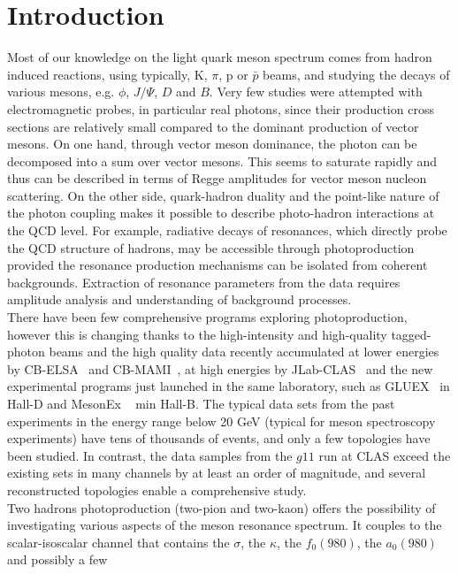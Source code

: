 \documentclass[twocolumn,superscriptaddress,prd]{revtex4}
\begin{document}
\section{\label{sec:intro}Introduction}
Most of our knowledge on the light quark meson spectrum comes from
hadron induced reactions, using typically, K, $\pi$, p or $\bar p$ beams, and studying  the  decays of various mesons,
e.g. $\phi$, $J/\Psi$, $D$ and $B$.
Very few studies were attempted with electromagnetic probes, in particular real photons,  since their production 
cross sections are relatively small compared to the dominant production 
of vector mesons. On one hand, through vector meson dominance,
the photon can be decomposed into a sum over vector
mesons. This seems to saturate rapidly and thus can be described in
terms of Regge amplitudes for vector meson nucleon scattering. On the
other side, quark-hadron duality and the point-like nature of the photon
coupling makes it possible to describe photo-hadron interactions at the
QCD level. For example, radiative decays of resonances, which directly
probe the QCD structure of hadrons, may be accessible through photoproduction
provided the resonance production mechanisms can be isolated
from coherent backgrounds. Extraction of resonance parameters from the
data requires amplitude analysis and understanding of background processes.\\
There have been few comprehensive programs exploring photoproduction,
however this is changing thanks to the high-intensity and high-quality tagged-photon beams and the high quality
data recently accumulated at lower
energies by CB-ELSA~\cite{elsa} and CB-MAMI~\cite{mami}, 
at high energies by JLab-CLAS~\cite{clas}  and the new experimental programs just launched in the same laboratory,
such as GLUEX~\cite{gluex} in Hall-D and MesonEx  ~\cite{mesonex} min Hall-B.
The typical data sets from the
past experiments in the energy range below 20 GeV (typical for meson
spectroscopy experiments) have tens of thousands of events, and only a
few topologies have been studied\cite{Ballam73,Aston80,Fries78}. 
In contrast, the data samples from
the $g11$  run at CLAS exceed the existing sets in many channels by at
least an order of magnitude, and several reconstructed topologies enable
a comprehensive study.\\
Two hadrons photoproduction (two-pion and two-kaon) offers the possibility of investigating various aspects of the  meson resonance spectrum. 
It couples to the scalar-isoscalar channel that contains the $\sigma$,  the $\kappa$, the $f_0(980)$, the $a_0(980)$ and possibly a few 
\end{document}
